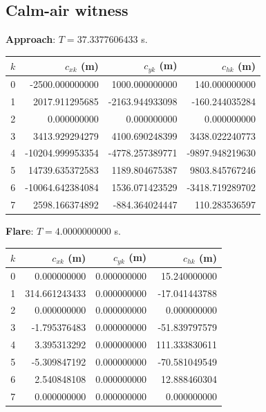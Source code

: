 \subsection*{Calm-air witness}
\textbf{Approach}: $T=37.3377606433$ s.\par
\begin{center}\small\begin{tabular}{@{}rrrr@{}}\toprule $k$ & $c_{xk}$ (m) & $c_{yk}$ (m) & $c_{hk}$ (m)\\\midrule
0 & -2500.000000000 & 1000.000000000 & 140.000000000\\
1 & 2017.911295685 & -2163.944933098 & -160.244035284\\
2 & 0.000000000 & 0.000000000 & 0.000000000\\
3 & 3413.929294279 & 4100.690248399 & 3438.022240773\\
4 & -10204.999953354 & -4778.257389771 & -9897.948219630\\
5 & 14739.635372583 & 1189.804675387 & 9803.845767246\\
6 & -10064.642384084 & 1536.071423529 & -3418.719289702\\
7 & 2598.166374892 & -884.364024447 & 110.283536597\\
\bottomrule\end{tabular}\end{center}
\textbf{Flare}: $T=4.0000000000$ s.\par
\begin{center}\small\begin{tabular}{@{}rrrr@{}}\toprule $k$ & $c_{xk}$ (m) & $c_{yk}$ (m) & $c_{hk}$ (m)\\\midrule
0 & 0.000000000 & 0.000000000 & 15.240000000\\
1 & 314.661243433 & 0.000000000 & -17.041443788\\
2 & 0.000000000 & 0.000000000 & 0.000000000\\
3 & -1.795376483 & 0.000000000 & -51.839797579\\
4 & 3.395313292 & 0.000000000 & 111.333830611\\
5 & -5.309847192 & 0.000000000 & -70.581049549\\
6 & 2.540848108 & 0.000000000 & 12.888460304\\
7 & 0.000000000 & 0.000000000 & 0.000000000\\
\bottomrule\end{tabular}\end{center}
\clearpage
